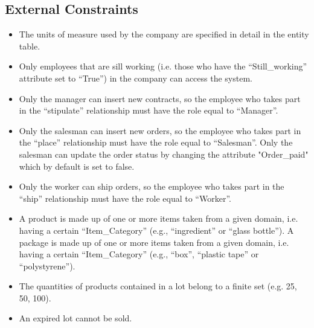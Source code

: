 \subsection{External Constraints}
\begin{itemize}
\item The units of measure used by the company are specified in detail in the entity table.
\item Only employees that are sill working (i.e. those who have the ``Still\_working'' attribute set to ``True'') in the company can access the system.
\item Only the manager can insert new contracts, so the employee who takes part in the ``stipulate'' relationship must have the role equal to ``Manager''. 
\item Only the salesman can insert new orders, so the employee who takes part in the ``place'' relationship must have the role equal to ``Salesman''. Only the salesman can update the order status by changing the attribute "Order\_paid" which by default is set to false.
\item Only the worker can ship orders, so the employee who takes part in the ``ship'' relationship must have the role equal to ``Worker''.
\item A product is made up of one or more items taken from a given domain, i.e. having a certain ``Item\_Category'' (e.g., ``ingredient'' or ``glass bottle''). A package is made up of one or more items taken from a given domain, i.e. having a certain ``Item\_Category'' (e.g., ``box'', ``plastic tape'' or ``polystyrene'').
\item The quantities of products contained in a lot belong to a finite set (e.g. 25, 50, 100).
\item An expired lot cannot be sold.
\end{itemize}
